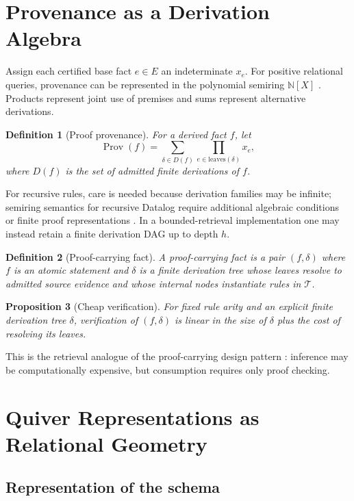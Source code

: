 \documentclass[11pt]{article}
\newtheorem{definition}{Definition}[section]
\newtheorem{proposition}[definition]{Proposition}
\newcommand{\Prov}{\operatorname{Prov}}
\newcommand{\T}{\mathcal{T}}
\begin{document}
\section{Provenance as a Derivation Algebra}

Assign each certified base fact $e\in E$ an indeterminate $x_e$. For positive relational queries, provenance can be represented in the polynomial semiring $\mathbb{N}[X]$ \citep{green2007}. Products represent joint use of premises and sums represent alternative derivations.

\begin{definition}[Proof provenance]
For a derived fact $f$, let
\[
\Prov(f)=\sum_{\delta\in D(f)}\prod_{e\in \mathrm{leaves}(\delta)}x_e,
\]
where $D(f)$ is the set of admitted finite derivations of $f$.
\end{definition}

For recursive rules, care is needed because derivation families may be infinite; semiring semantics for recursive Datalog require additional algebraic conditions or finite proof representations \citep{bourgeois2022,khamis2021}. In a bounded-retrieval implementation one may instead retain a finite derivation DAG up to depth $h$.

\begin{definition}[Proof-carrying fact]
A proof-carrying fact is a pair $(f,\delta)$ where $f$ is an atomic statement and $\delta$ is a finite derivation tree whose leaves resolve to admitted source evidence and whose internal nodes instantiate rules in $\T$.
\end{definition}

\begin{proposition}[Cheap verification]
For fixed rule arity and an explicit finite derivation tree $\delta$, verification of $(f,\delta)$ is linear in the size of $\delta$ plus the cost of resolving its leaves.
\end{proposition}

This is the retrieval analogue of the proof-carrying design pattern \citep{necula1997}: inference may be computationally expensive, but consumption requires only proof checking.

\section{Quiver Representations as Relational Geometry}

\subsection{Representation of the schema}
\end{document}
